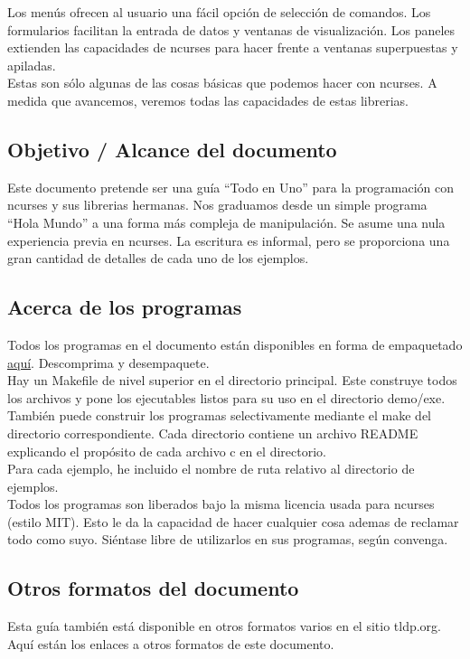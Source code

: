 \documentclass{article}
\begin{document}
Los menús ofrecen al usuario una fácil opción de selección de comandos. Los
formularios facilitan la entrada de datos y ventanas de visualización. Los
paneles extienden las capacidades de ncurses para hacer frente a ventanas
superpuestas y apiladas.\\

Estas son sólo algunas de las cosas básicas que podemos hacer con ncurses. A
medida que avancemos, veremos todas las capacidades de estas librerias.\\

\subsection{Objetivo / Alcance del documento}%
Este documento pretende ser una guía “Todo en Uno” para la programación con
ncurses y sus librerias hermanas. Nos graduamos desde un simple programa “Hola
Mundo” a una forma más compleja de manipulación. Se asume una nula experiencia
previa en ncurses. La escritura es informal, pero se proporciona una gran
cantidad de detalles de cada uno de los ejemplos.

\subsection{Acerca de los programas}%
Todos los programas en el documento están disponibles en forma de empaquetado
\href{http://www.tldp.org/HOWTO/NCURSES-Programming-HOWTO/ncurses_programs.tar.gz}{aquí}.
Descomprima y desempaquete.\\

Hay un Makefile de nivel superior en el directorio principal. Este construye
todos los archivos y pone los ejecutables listos para su uso en el directorio
demo/exe. También puede construir los programas selectivamente mediante el make
del directorio correspondiente. Cada directorio contiene un archivo README
explicando el propósito de cada archivo c en el directorio.\\

Para cada ejemplo, he incluido el nombre de ruta relativo al directorio de
ejemplos.\\

Todos los programas son liberados bajo la misma licencia usada para ncurses
(estilo MIT). Esto le da la capacidad de hacer cualquier cosa ademas de
reclamar todo como suyo. Siéntase libre de utilizarlos en sus programas, según
convenga.\\

\subsection{Otros formatos del documento}%
Esta guía también está disponible en otros formatos varios en el sitio
tldp.org. Aquí están los enlaces a otros formatos de este documento.
\end{document}
